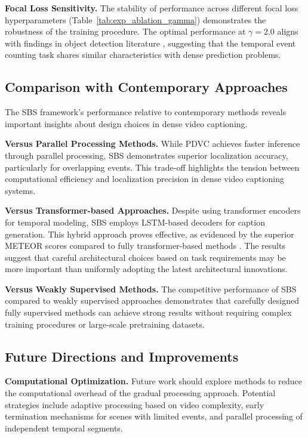 \textbf{Focal Loss Sensitivity.}
The stability of performance across different focal loss hyperparameters (Table~\ref{tab:exp_ablation_gamma}) demonstrates the robustness of the training procedure. The optimal performance at $\gamma = 2.0$ aligns with findings in object detection literature \cite{lin2017focal}, suggesting that the temporal event counting task shares similar characteristics with dense prediction problems.

\subsection{Comparison with Contemporary Approaches}

The SBS framework's performance relative to contemporary methods reveals important insights about design choices in dense video captioning.

\textbf{Versus Parallel Processing Methods.}
While PDVC \cite{wang2021end} achieves faster inference through parallel processing, SBS demonstrates superior localization accuracy, particularly for overlapping events. This trade-off highlights the tension between computational efficiency and localization precision in dense video captioning systems.

\textbf{Versus Transformer-based Approaches.}
Despite using transformer encoders for temporal modeling, SBS employs LSTM-based decoders for caption generation. This hybrid approach proves effective, as evidenced by the superior METEOR scores compared to fully transformer-based methods \cite{zhou2018end}. The results suggest that careful architectural choices based on task requirements may be more important than uniformly adopting the latest architectural innovations.

\textbf{Versus Weakly Supervised Methods.}
The competitive performance of SBS compared to weakly supervised approaches \cite{chen2021towards} demonstrates that carefully designed fully supervised methods can achieve strong results without requiring complex training procedures or large-scale pretraining datasets.

\subsection{Future Directions and Improvements}

\textbf{Computational Optimization.}
Future work should explore methods to reduce the computational overhead of the gradual processing approach. Potential strategies include adaptive processing based on video complexity, early termination mechanisms for scenes with limited events, and parallel processing of independent temporal segments.

